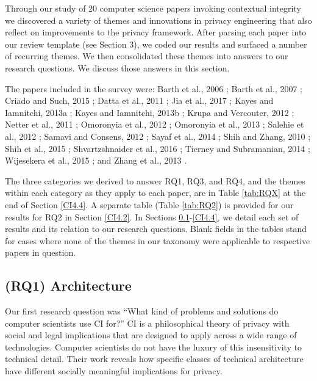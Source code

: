 \documentclass[../thesis.tex]{subfiles}
\begin{document}
Through our study of 20 computer science papers invoking contextual
integrity we discovered a variety of themes and innovations in privacy
engineering that also reflect on improvements to the privacy framework.
After parsing each paper into our review template (see Section 3), we
coded our results and surfaced a number of recurring themes. We then
consolidated these themes into answers to our research questions. We
discuss those answers in this section.

The papers included in the survey were:
Barth et al., 2006 \cite{barth06sp};
Barth et al., 2007 \cite{barth07csf};
Criado and Such, 2015 \cite{criado2015implicit};
Datta et al., 2011 \cite{datta2011understanding};
Jia et al., 2017 \cite{jia2017contexiot};
Kayes and Iamnitchi, 2013a \cite{kayes2013aegis};
Kayes and Iamnitchi, 2013b \cite{kayes2013out};
Krupa and Vercouter, 2012 \cite{krupa2012handling};
Netter et al., 2011 \cite{netter2011assisted};
Omoronyia et al., 2012 \cite{omoronyia2012caprice};
Omoronyia et al., 2013 \cite{omoronyia2013engineering};
Salehie et al., 2012 \cite{salehie2012adaptive};
Samavi and Consens, 2012 \cite{samavi2012l2tap+};
Sayaf et al., 2014 \cite{sayaf2014mathrm};
Shih and Zhang, 2010 \cite{shih2010towards};
Shih et al., 2015 \cite{shih2015privacy};
Shvartzshnaider et al., 2016 \cite{shvartzshnaider2016learning};
Tierney and Subramanian, 2014 \cite{tierney2014realizing};
Wijesekera et al., 2015 \cite{wijesekera2015android};
and Zhang et al., 2013 \cite{zhang2013no}.

The three categories we derived to
answer RQ1, RQ3, and RQ4, and the themes within each category as they
apply to each paper, are in Table \ref{tab:RQX} at the end of Section \ref{CI4.4}. A
separate table (Table \ref{tab:RQ2}) is provided for our results for RQ2 in Section
\ref{CI4.2}. In Sections \ref{CI4.1}-\ref{CI4.4}, we detail each
set of results and its
relation to our research questions. Blank fields in the tables stand
for cases where none of the themes in our taxonomy were applicable to
respective papers in question.

\subsection{(RQ1) Architecture}
\label{CI4.1}

Our first research question was
``What kind of problems and solutions do computer
scientists use CI for?'' CI is a philosophical theory
of privacy with social and legal implications that are designed to
apply across a wide range of technologies. Computer scientists do not
have the luxury of this insensitivity to technical detail. Their work
reveals how specific classes of technical architecture have different
socially meaningful implications for privacy.
\end{document}
